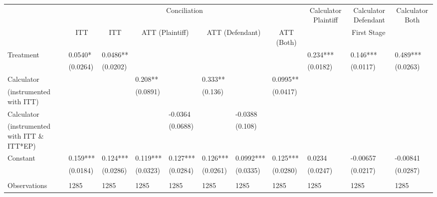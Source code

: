 \begin{tabular}{lrrlrlrlrrr}
      & \multicolumn{7}{c}{Conciliation}                      & \multicolumn{1}{c}{Calculator Plaintiff} & \multicolumn{1}{c}{Calculator Defendant} & \multicolumn{1}{c}{Calculator Both} \\
\cmidrule{2-11}      & \multicolumn{1}{c}{ITT} & \multicolumn{1}{c}{ITT} & \multicolumn{2}{c}{ATT (Plaintiff)} & \multicolumn{2}{c}{ATT  (Defendant)} & \multicolumn{1}{c}{ATT (Both)} & \multicolumn{3}{c}{First Stage} \\
\cmidrule{2-11}Treatment  & \multicolumn{1}{l}{0.0540*} & \multicolumn{1}{l}{0.0486**} &       &       &       &       &       & \multicolumn{1}{l}{0.234***} & \multicolumn{1}{l}{0.146***} & \multicolumn{1}{l}{0.489***} \\
      & \multicolumn{1}{l}{(0.0264)} & \multicolumn{1}{l}{(0.0202)} &       &       &       &       &       & \multicolumn{1}{l}{(0.0182)} & \multicolumn{1}{l}{(0.0117)} & \multicolumn{1}{l}{(0.0263)} \\
Calculator  & \multicolumn{1}{l}{} & \multicolumn{1}{l}{} & 0.208** &       & 0.333** &       & 0.0995** &       &       &  \\
(instrumented with ITT) & \multicolumn{1}{l}{} & \multicolumn{1}{l}{} & (0.0891) &       & (0.136) &       & (0.0417) &       &       &  \\
Calculator  &       &       &       & \multicolumn{1}{l}{-0.0364} &       & \multicolumn{1}{l}{-0.0388} &       &       &       &  \\
(instrumented with ITT \& ITT*EP) &       &       &       & \multicolumn{1}{l}{(0.0688)} &       & \multicolumn{1}{l}{(0.108)} &       &       &       &  \\
Constant  & \multicolumn{1}{l}{0.159***} & \multicolumn{1}{l}{0.124***} & 0.119*** & \multicolumn{1}{l}{0.127***} & 0.126*** & \multicolumn{1}{l}{0.0992***} & 0.125*** & \multicolumn{1}{l}{0.0234} & \multicolumn{1}{l}{-0.00657} & \multicolumn{1}{l}{-0.00841} \\
      & \multicolumn{1}{l}{(0.0184)} & \multicolumn{1}{l}{(0.0286)} & (0.0323) & \multicolumn{1}{l}{(0.0284)} & (0.0261) & \multicolumn{1}{l}{(0.0335)} & (0.0280) & \multicolumn{1}{l}{(0.0247)} & \multicolumn{1}{l}{(0.0217)} & \multicolumn{1}{l}{(0.0287)} \\
      &       &       &       &       &       &       &       &       &       &  \\
\midrule
Observations & \multicolumn{1}{l}{1285} & \multicolumn{1}{l}{1285} & 1285  & \multicolumn{1}{l}{1285} & 1285  & \multicolumn{1}{l}{1285} & 1285  & \multicolumn{1}{l}{1285} & \multicolumn{1}{l}{1285} & \multicolumn{1}{l}{1285} \\

\end{tabular}
